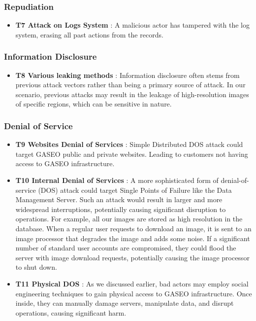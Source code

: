 \documentclass[12pt]{article}
\begin{document}
\subsubsection*{Repudiation}
\begin{itemize}
    \item \textbf{ T7 Attack on Logs System }: A malicious actor has tampered with the log system, erasing all past actions from the records. 
\end{itemize}

\subsubsection*{Information Disclosure}
\begin{itemize}
    \item \textbf{ T8 Various leaking methods }: Information disclosure often stems from previous attack vectors rather than being a primary source of attack. In our scenario, previous attacks may result in the leakage of high-resolution images of specific regions, which can be sensitive in nature.
\end{itemize}

\subsubsection*{Denial of Service}
\begin{itemize}
    \item \textbf{ T9 Websites Denial of Services }: Simple Distributed DOS attack could target GASEO public and private websites. Leading to customers not having access to GASEO infrastructure.

    \item \textbf{ T10 Internal Denial of Services }: A more sophisticated form of denial-of-service (DOS) attack could target Single Points of Failure like the Data Management Server. Such an attack would result in larger and more widespread interruptions, potentially causing significant disruption to operations. For example, all our images are stored as high resolution in the database. When a regular user requests to download an image, it is sent to an image processor that degrades the image and adds some noise. If a significant number of standard user accounts are compromised, they could flood the server with image download requests, potentially causing the image processor to shut down.

    \item \textbf{ T11 Physical DOS }: As we discussed earlier, bad actors may employ social engineering techniques to gain physical access to GASEO infrastructure. Once inside, they can manually damage servers, manipulate data, and disrupt operations, causing significant harm.
\end{itemize}
\end{document}
